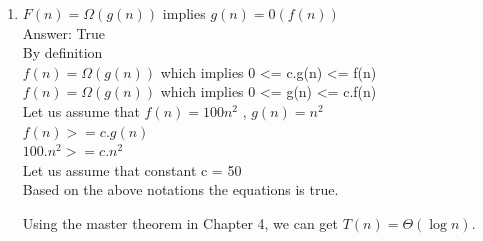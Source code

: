 \documentclass[11pt]{article}
\begin{document}
\begin{enumerate}

\itemsep 0.35in
 
\item

$F(n) = \Omega (g(n))$ implies $g(n) = $0$ (f(n))$ \\

Answer: True \\

By definition\\
$f(n) = \Omega (g(n))$ which implies  0 \textless{}= c.g(n) \textless{}= f(n) \\
$f(n) = \Omega (g(n))$ which implies 0 \textless{}=  g(n) \textless{}= c.f(n) \\

Let us assume that $f(n) = 100n^2$ , $g(n) = n^2$ \\

$f(n) >=  c.g(n)$ \\
$100.n^2 >=  c.n^2$\\

Let us assume that constant c = 50 \\

Based on the above notations the equations is true.

      Using the master theorem in Chapter 4, we can 
      get $T(n) = \Theta (\log{} n)$.

   
\end{enumerate}
\end{document}
